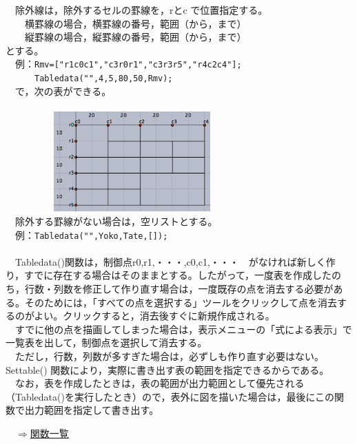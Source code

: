 \documentclass[papersize,a4paper,12pt,uplatex]{jsarticle}
\begin{document}
\begin{description}
　除外線は，除外するセルの罫線を，rとc で位置指定する。\\
　　横罫線の場合，横罫線の番号，範囲（から，まで）\\
　　縦罫線の場合，縦罫線の番号，範囲（から，まで）\\
とする。\\

　例：\verb|Rmv=["r1c0c1","c3r0r1","c3r3r5","r4c2c4"];|\\
　　　\verb|Tabledata("",4,5,80,50,Rmv);|\\
　で，次の表ができる。\\
　\\
　　　　　\includegraphics[bb=0 0 784 503 , width=6cm]{Fig/table03.png}\\
　除外する罫線がない場合は，空リストとする。\\

　例：\verb|Tabledata("",Yoko,Tate,[]);|\\
\\
　Tabledata()関数は，制御点r0,r1,・・・,c0,c1,・・・　がなければ新しく作り，すでに存在する場合はそのままとする。したがって，一度表を作成したのち，行数・列数を修正して作り直す場合は，一度既存の点を消去する必要がある。そのためには，「すべての点を選択する」ツールをクリックして点を消去するのがよい。クリックすると，消去後すぐに新規作成される。\\
　すでに他の点を描画してしまった場合は，表示メニューの「式による表示」で一覧表を出して，制御点を選択して消去する。\\
　ただし，行数，列数が多すぎた場合は，必ずしも作り直す必要はない。Settable() 関数により，実際に書き出す表の範囲を指定できるからである。\\

　なお，表を作成したときは，表の範囲が出力範囲として優先される（Tabledata()を実行したとき）ので，表外に図を描いた場合は，最後にこの関数で出力範囲を指定して書き出す。\\

\begin{flushright}　\hyperlink{functionlist}{$\Rightarrow$関数一覧}\end{flushright}


\end{description}
\end{document}
